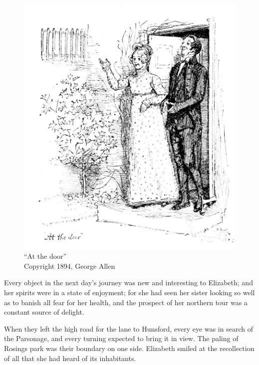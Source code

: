\begin{figure}[htbp]
    \centering
    \includegraphics[width=\textwidth]{illustrations/i_223_a.jpg}
    \caption{“At the door”\\ Copyright 1894, George Allen}
    \label{fig:image}
\end{figure}


Every object in the next day's journey was new and interesting to Elizabeth; and her spirits were in a state of enjoyment; for she had seen her sister looking so well as to banish all fear for her health, and the prospect of her northern tour was a constant source of delight.

When they left the high road for the lane to Hunsford, every eye was in search of the Parsonage, and every turning expected to bring it in view. The paling of Rosings park was their boundary on one side. Elizabeth smiled at the recollection of all that she had heard of its inhabitants.

